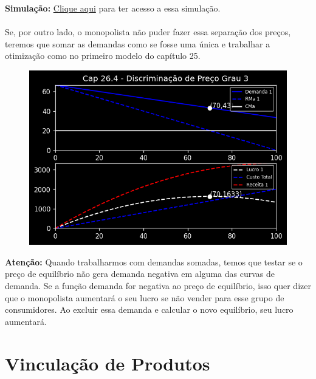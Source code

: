 \documentclass[a4paper,11pt,oneside]{book}
\theoremstyle{definition}
\theoremstyle{break}
\begin{document}
\textbf{Simulação:} \href{https://colab.research.google.com/drive/1TYSpJLSEg4yInKX_viA6aP8qLiRsHdBm?usp=sharing}{Clique aqui} para ter acesso a essa simulação.
\\
\\
Se, por outro lado, o monopolista não puder fazer essa separação dos preços, teremos que somar as demandas como se fosse uma única e trabalhar a otimização como no primeiro modelo do capítulo 25.

\begin{figure}[H]
\centering
\includegraphics[scale=0.8]{cap26_4-discriminacao_grau3_2.png}
\end{figure}

\textbf{Atenção:} Quando trabalharmos com demandas somadas, temos que testar se o preço de equilíbrio não gera demanda negativa em alguma das curvas de demanda. Se a função demanda for negativa ao preço de equilíbrio, isso quer dizer que o monopolista aumentará o seu lucro se não vender para esse grupo de consumidores. Ao excluir essa demanda e calcular o novo equilíbrio, seu lucro aumentará.

\section{Vinculação de Produtos}
\end{document}
